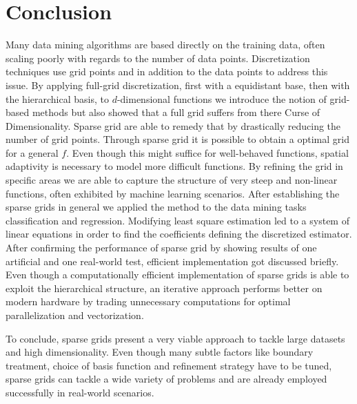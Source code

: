 \section{Conclusion}
Many data mining algorithms are based directly on the training data, often
scaling poorly with regards to the number of data points.
Discretization techniques use grid points and in addition to the data
points to address this issue. By applying full-grid discretization, first
with a equidistant base, then with the hierarchical basis,
to $d$-dimensional functions we introduce the
notion of grid-based methods but also showed that a full grid suffers from
there Curse of Dimensionality.
Sparse grid are able to remedy that by drastically reducing the number of
grid points. Through sparse grid it is possible to obtain a optimal grid
for a general $f$. Even though this might suffice for well-behaved functions,
spatial adaptivity is necessary to model more difficult functions. By refining
the grid in specific areas we are able to capture the structure of very steep
and non-linear functions, often exhibited by machine learning scenarios.
After establishing the sparse grids in general we applied the method to
the data mining tasks classification and regression. Modifying least square
estimation led to a system of linear equations in order to find the
coefficients defining the discretized estimator. After confirming the
performance of sparse grid by showing
results of one artificial and one real-world test, efficient
implementation got discussed briefly. Even though a computationally
efficient implementation of sparse grids is able to exploit the hierarchical
structure, an iterative approach performs better on modern hardware by
trading unnecessary computations for
optimal parallelization and vectorization.
\par
To conclude, sparse grids present a very viable approach to tackle large
datasets and high dimensionality. Even though many subtle factors like
boundary treatment, choice of basis function and refinement strategy have to be
tuned, sparse grids can tackle a wide variety of problems and are already 
employed successfully in real-world scenarios.

